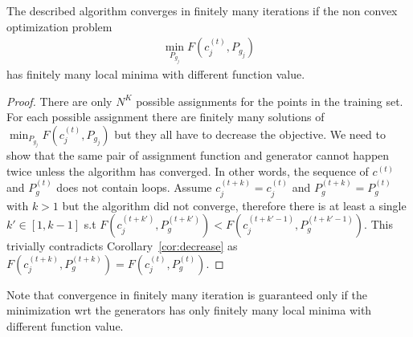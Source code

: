 \documentclass{article}
\begin{document}
 \begin{theorem}
 The described algorithm converges in finitely many iterations if the non convex optimization problem
 \begin{align*}
 \min_{P_{g_j}}F(c_j^{(t)},P_{g_j})
 \end{align*} 
 has finitely many local minima with different function value.
 \begin{proof}
There are only $N^K$ possible assignments for the points in the training set. For each possible assignment there are finitely many solutions of $\min_{P_{g_j}}F(c_j^{(t)},P_{g_j})$ but they all have to decrease the objective.
We need to show that the same pair of assignment function and generator cannot happen twice unless the algorithm has converged. In other words, the sequence of $c^{(t)}$ and $P^{(t)}_{g}$ does not contain loops.
Assume $c_j^{(t+k)} = c_j^{(t)}$ and $P_{g}^{(t+k)} = P_{g}^{(t)}$ with $k>1$ but the algorithm did not converge, therefore there is at least a single $k' \in [1,k-1]$ s.t $F(c_j^{(t+k')}, P_{g}^{(t+k')})<F(c_j^{(t+k'-1)}, P_{g}^{(t+k'-1)})$. This trivially contradicts Corollary~\ref{cor:decrease} as $F(c_j^{(t+k)}, P_{g}^{(t+k)})=F(c_j^{(t)}, P_{g}^{(t)})$.
 \end{proof}
 \end{theorem}
  
Note that convergence in finitely many iteration is guaranteed only if the minimization wrt the generators has only finitely many local minima with different function value.
\end{document}
